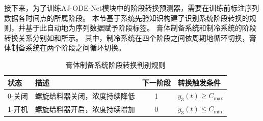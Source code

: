 接下来，为了训练AJ-ODE-Net模块中的阶段转换预测器，需要在训练前标注序列数据各时间点的所属阶段。
本节基于系统先验知识构建了识别系统阶段转换的规则，并基于此自动地为序列数据赋予阶段标签。
膏体制备系统和制冷系统的阶段转换关系分别如和所示。
其中，制冷系统在四个阶段之间依周期地循环切换，膏体制备系统在两个阶段之间循环切换。
\begin{table}[]
    \centering
    \caption{膏体制备系统阶段转换判别规则}
    \label{tab:paste_dfa}
    \begin{tabular}{llcl}
    \toprule
       状态                  &    描述             & 下一阶段 & 转换触发条件                                   \\ 
       \hline
    0-关闭                       & 螺旋给料器关闭，浓度持续降低                             & 1          & $y_3(t)\geq C_{\max}$                                \\
    1-开机                       & 螺旋给料器开启，浓度持续增加                                   & 0          & $y_3(t)\leq C_{\min}$                                \\
    \bottomrule
    \end{tabular}
\end{table}

